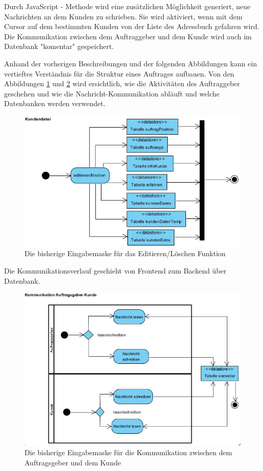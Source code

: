 Durch JavaScript - Methode wird eine zusätzlichen Möglichkeit generiert, neue Nachrichten an dem Kunden zu schrieben. Sie wird aktiviert, wenn mit dem Cursor auf dem bestimmten Kunden von der Liste des Adressbuch gefahren wird. Die Kommunikation zwischen dem Auftraggeber und dem Kunde wird auch im Datenbank "komentar" gespeichert. 

Anhand der vorherigen Beschreibungen und der folgenden Abbildungen kann ein vertieftes Verständnis für die Struktur eines Auftrages aufbauen. Von den Abbildungen \ref{fig:Kunden Datei Editieren und Löschen} und \ref{fig:Kommunikation Auftraggeber Kunde} wird ersichtlich, wie die Aktivitäten des Auftraggeber geschehen und wie die Nachricht-Kommunikation abläuft und welche Datenbanken werden verwendet. 
\pagebreak


\begin{figure}[h]
	\centering
	\includegraphics[width=0.7\linewidth]{Graphics/Kundendatei.JPG}
	\caption[Kundeansicht]{Die bisherige Eingabemaske für das Editieren/Löschen Funktion}
	\label{fig:Kunden Datei Editieren und Löschen}
\end{figure}

Die Kommunikationsverlauf geschieht von Frontend zum Backend über Datenbank. 

\begin{figure}[h]
	\centering
	\includegraphics[width=0.7\linewidth]{Graphics/Kommunikation.JPG}
	\caption[Kundeansicht]{Die bisherige Eingabemaske für die Kommunikation zwischen dem Auftragsgeber und dem Kunde}
	\label{fig:Kommunikation Auftraggeber Kunde}
\end{figure}

